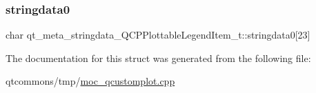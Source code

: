 \subsubsection{\texorpdfstring{stringdata0}{stringdata0}}
{\footnotesize\ttfamily char qt\+\_\+meta\+\_\+stringdata\+\_\+\+Q\+C\+P\+Plottable\+Legend\+Item\+\_\+t\+::stringdata0\mbox{[}23\mbox{]}}



The documentation for this struct was generated from the following file\+:\begin{DoxyCompactItemize}
\item 
qtcommons/tmp/\mbox{\hyperlink{moc__qcustomplot_8cpp}{moc\+\_\+qcustomplot.\+cpp}}\end{DoxyCompactItemize}
